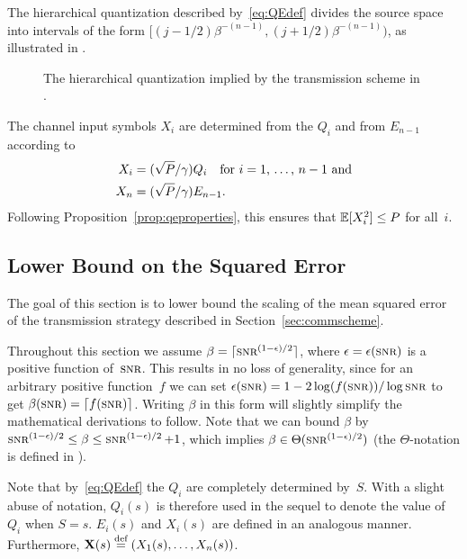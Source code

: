 \begin{remark}
  \label{rem:scgeometry}
  The hierarchical quantization described by~\eqref{eq:QEdef} divides the source
  space into intervals of the form $[(j-1/2)\beta^{-(n-1)},
  (j+1/2)\beta^{-(n-1)})$, as illustrated in .
\end{remark}
\begin{figure}[tbp]
  \begin{center}
  \end{center}
  \caption{The hierarchical quantization implied by the transmission scheme in
  .}
  \label{fig:hierarchicalsq}
\end{figure}

The channel input symbols $X_i$ are determined from the $Q_i$ and from $E_{n-1}$
according to 
\begin{align}
  X_i &= (\sqrt{P}/\gamma) Q_i \quad
  \text{for $i = 1$, \dots, $n-1$ and} \nonumber\\
  X_n &= (\sqrt{P}/\gamma) E_{n-1}.
  \label{eq:Xdef}
\end{align}
Following Proposition~\ref{prop:qeproperties}, this ensures that $\mathbb{E}[X_i^2] \le
P$ for all~$i$. 


\subsection{Lower Bound on the Squared Error}\label{sec:scalarlowerbound}

The goal of this section is to lower bound the scaling of the mean squared error
of the transmission strategy described in Section~\ref{sec:commscheme}.

\begin{remark}
  \label{rem:betaepswlog}
  Throughout this section we assume $\beta = \lceil \snr^{(1-\e)/2}\rceil$,
  where $\e = \e(\snr)$ is a positive function of~$\snr$. This results in no
  loss of generality, since for an arbitrary positive function~$f$ we can set
  $\e(\snr) = 1-2 \log(f(\snr))/\log\snr$ to get $\beta(\snr) = \lceil f(\snr)
  \rceil$.  Writing $\beta$ in this form will slightly simplify the mathematical
  derivations to follow. Note that we can bound $\beta$ by $\snr^{(1-\e)/2} \le
  \beta \le \snr^{(1-\e)/2} + 1$, which implies $\beta \in
  \Theta(\snr^{(1-\e)/2})$ (the $\Theta$-notation is defined in
  ).
\end{remark}

\begin{remark}
  \label{rem:functionnotation}
  Note that by~\eqref{eq:QEdef} the $Q_i$ are completely determined by~$S$.
  With a slight abuse of notation, $Q_i(s)$ is therefore used in the sequel to
  denote the value of~$Q_i$ when $S = s$. $E_i(s)$ and $X_i(s)$ are defined in
  an analogous manner. Furthermore, $\mathbf{X}(s) \stackrel{\text{def}}{=} (X_1(s), \dots, X_n(s))$.
\end{remark}

